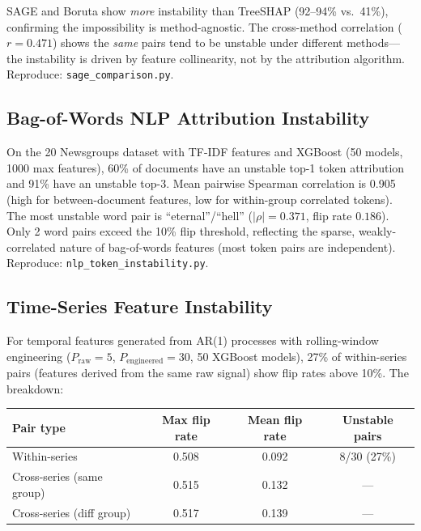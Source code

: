 \documentclass{article}
\begin{document}
SAGE and Boruta show \emph{more} instability than TreeSHAP (92--94\% vs.\ 41\%), confirming the impossibility is method-agnostic. The cross-method correlation ($r{=}0.471$) shows the \emph{same} pairs tend to be unstable under different methods---the instability is driven by feature collinearity, not by the attribution algorithm.
Reproduce: \texttt{sage\_comparison.py}.

\subsection{Bag-of-Words NLP Attribution Instability}
\label{sec:nlp-instability}

On the 20 Newsgroups dataset with TF-IDF features and XGBoost (50 models, 1000 max features), 60\% of documents have an unstable top-1 token attribution and 91\% have an unstable top-3. Mean pairwise Spearman correlation is 0.905 (high for between-document features, low for within-group correlated tokens). The most unstable word pair is ``eternal''/``hell'' ($|\rho|{=}0.371$, flip rate $0.186$). Only 2 word pairs exceed the 10\% flip threshold, reflecting the sparse, weakly-correlated nature of bag-of-words features (most token pairs are independent).
Reproduce: \texttt{nlp\_token\_instability.py}.

\subsection{Time-Series Feature Instability}
\label{sec:timeseries}

For temporal features generated from AR(1) processes with rolling-window engineering ($P_{\text{raw}}{=}5$, $P_{\text{engineered}}{=}30$, 50 XGBoost models), 27\% of within-series pairs (features derived from the same raw signal) show flip rates above 10\%. The breakdown:

\begin{center}
\small
\begin{tabular}{@{}lccc@{}}
\toprule
Pair type & Max flip rate & Mean flip rate & Unstable pairs \\
\midrule
Within-series       & 0.508 & 0.092 & 8/30 (27\%) \\
Cross-series (same group) & 0.515 & 0.132 & --- \\
Cross-series (diff group) & 0.517 & 0.139 & --- \\
\bottomrule
\end{tabular}
\end{center}
\end{document}
